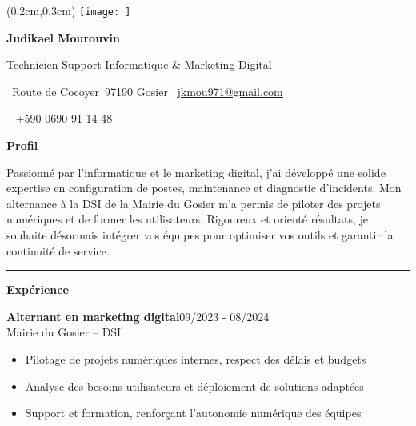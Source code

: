 \documentclass[a4paper]{article}
\renewcommand{\colorbox}[2]{#2}%
\newcommand{\fullrule}{\hspace{-1.5cm}\rule{\paperwidth}{0.4pt}}
\newcommand{\cvsection}[1]{%
  \vspace{6pt}\textbf{\Large #1}\par\vspace{2pt}}
\begin{document}
\color{white}
\ifx\relax\relax\else
\begin{textblock*}{4cm}(0.2cm,0.3cm)
  \texttt{[image: ]}
\end{textblock*}
 \fi
\begin{center}
  {\fontsize{44pt}{24pt}\selectfont\bfseries Judikael Mourouvin}

  \bigskip
  {\Large Technicien Support Informatique \& Marketing Digital}

  \bigskip\bigskip
  \faMapMarker~Route de Cocoyer\ 97190 Gosier
  \quad\faEnvelope~\href{mailto:jkmou971@gmail.com}{jkmou971@gmail.com}

  \bigskip
  \faPhone~ +590 0690 91 14 48
  \quad \faLinkedin\ \href{}{}
 

  
\end{center}
 \vspace{0.75cm}
\cvsection{Profil}

Passionné par l’informatique et le marketing digital, j’ai développé une solide expertise en configuration de postes, maintenance et diagnostic d’incidents. Mon alternance à la DSI de la Mairie du Gosier m’a permis de piloter des projets numériques et de former les utilisateurs. Rigoureux et orienté résultats, je souhaite désormais intégrer vos équipes pour optimiser vos outils et garantir la continuité de service.

\medskip\fullrule

\cvsection{Expérience}
\colorbox{maincolor}{%
  \begin{minipage}{\linewidth}
    \noindent
    \textbf{Alternant en marketing digital}\hfill 09/2023 - 08/2024\\
    Mairie du Gosier – DSI\\[-0.3em]
    \begin{itemize}[leftmargin=*]
      \item Pilotage de projets numériques internes, respect des délais et budgets \item Analyse des besoins utilisateurs et déploiement de solutions adaptées \item Support et formation, renforçant l’autonomie numérique des équipes
    \end{itemize}
  \end{minipage}}
\end{document}
